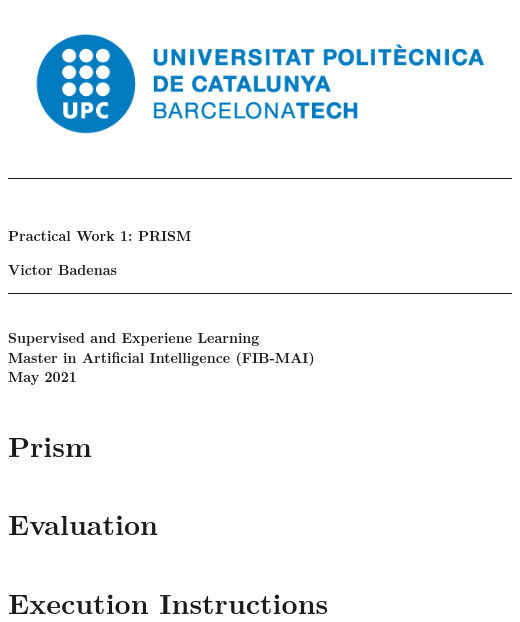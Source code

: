 \documentclass[oneside,11pt]{book}
\begin{document}
\titleformat{\chapter}[display]
{\normalfont\huge\bfseries}{\chaptertitlename\ \thechapter}{20pt}{\Huge}
\includegraphics[scale=.3]{upc-logo.png}
\begin{center}
\vspace*{2in}
\noindent\hfil\rule{17cm}{0.2mm}\hfil\\
\begin{Huge}
    \textbf{Practical Work 1: PRISM\\}
\end{Huge}
\vspace*{0.3in}
\begin{large}
    \textbf{Victor Badenas}
\end{large}
\noindent\hfil\rule{17cm}{0.2mm}\hfil\\
\vspace*{3in}
\textbf{Supervised and Experiene Learning\\}
\textbf{Master in Artificial Intelligence (FIB-MAI)\\}
\vspace*{0.2in}
\textbf{May 2021}

\end{center}
\thispagestyle{empty}
\clearpage

\tableofcontents
{}
\clearpage
{}

\chapter{Prism}


\chapter{Evaluation}


\chapter{Execution Instructions}


\printbibliography
\end{document}
